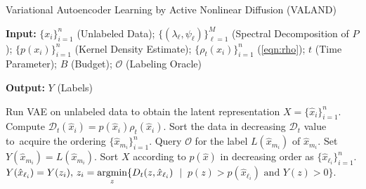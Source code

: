 \documentclass{article}
\newcommand{\argmin}{\operatornamewithlimits{argmin}}%
\def\hx{{\hat x}}
\newcommand{\Dt}{\mathcal{D}_{t}}
\begin{document}
\begin{algorithm}[!htb]
	\caption{\label{alg:VALAND}Variational Autoencoder Learning by Active Nonlinear Diffusion (VALAND)}
	\flushleft
	\flushleft
	\textbf{Input:} $\{x_{i}\}_{i=1}^{n}$ (Unlabeled Data); $\{(\lambda_{\ell},\psi_{\ell})\}_{\ell=1}^{M}$ (Spectral Decomposition of $P$); $\{p(x_{i})\}_{i=1}^{n}$ (Kernel Density Estimate);  $\{\rho_{t}(x_{i})\}_{i=1}^{n}$ (\ref{eqn:rho}); $t$ (Time Parameter); $B$ (Budget); $\mathcal{O}$ (Labeling Oracle)
	
	\vspace{5pt}
	
	\textbf{Output:} $Y$ (Labels)
	
		\vspace{5pt}


	\begin{algorithmic}[1]
	\STATE Run VAE on unlabeled data to obtain  the latent representation $X = \{\hx_{i}\}_{i=1}^{n}$.  
	\STATE Compute $\Dt(\hx_{i})=p(\hx_{i})\rho_{t}(\hx_{i})$.  
	\STATE Sort the data in decreasing $\Dt$ value to\ 
	acquire the ordering $\{\hx_{m_{i}}\}_{i=1}^{n}$.
	\STATE Query $\mathcal{O}$ for the label $L(\hx_{m_{i}})$ of $\hx_{m_{i}}$.
	\STATE Set $Y(\hx_{m_{i}})=L(\hx_{m_{i}})$.
	\ENDFOR
	\STATE Sort $X$ according to $p(\hx)$ in decreasing order as $\{\hx_{\ell_{i}}\}_{i=1}^{n}$.  
	\FOR{$i=1:n$}
	\IF{$Y(\hx_{\ell_{i}})=0$}
	\STATE $Y(\hx_{\ell_{i}})=Y(z_{i}), \, z_{i}=\displaystyle\argmin_{z}\{D_{t}(z,\hx_{\ell_{i}})$\ $| \ $ $p(z)>p(\hx_{\ell_{i}}) \text{ and } Y(z)>0\}$.
	\ENDIF
	\ENDFOR
	\end{algorithmic}
\end{algorithm}
\end{document}
